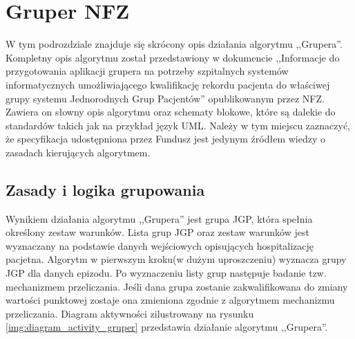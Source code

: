 \section{Gruper NFZ}
\label{sec:gruperNFZ}

W tym podrozdziale znajduje się skrócony opis działania algorytmu ,,Grupera''. Kompletny opis algorytmu został przedstawiony w dokumencie ,,Informacje do przygotowania aplikacji grupera na potrzeby szpitalnych systemów informatycznych umożliwiającego kwalifikację rekordu pacjenta do właściwej grupy systemu Jednorodnych Grup Pacjentów'' opublikowanym przez NFZ\cite{algorytm_grupera}. Zawiera on słowny opis algorytmu oraz schematy blokowe, które są dalekie do standardów takich jak na przykład język UML. Należy w tym miejscu zaznaczyć, że specyfikacja udostępniona przez Fundusz jest jedynym źródłem wiedzy o zasadach kierujących algorytmem.

\subsection{Zasady i logika grupowania}
\label{sec:zasadyLogikaGrupowania}
Wynikiem działania algorytmu ,,Grupera'' jest grupa JGP, która spełnia określony zestaw warunków. Lista grup JGP oraz zestaw warunków jest wyznaczany na podstawie danych wejściowych opisujących hospitalizację pacjetna. Algorytm w pierwszym kroku(w dużym uproszczeniu) wyznacza grupy JGP dla danych epizodu. Po wyznaczeniu listy grup następuje badanie tzw. mechanizmem przeliczania. Jeśli dana grupa zostanie zakwalifikowana do zmiany wartości punktowej zostaje ona zmieniona zgodnie z algorytmem mechanizmu przeliczania\cite{algorytm_grupera}. Diagram aktywności zilustrowany na rysunku \ref{img:diagram_activity_gruper} przedstawia działanie algorytmu ,,Grupera''.

